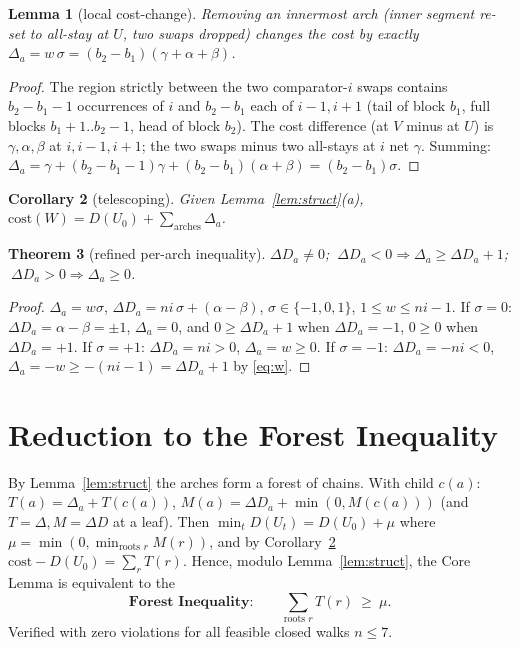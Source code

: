 \documentclass[11pt]{article}
\theoremstyle{plain}
\newtheorem{theorem}{Theorem}
\newtheorem{lemma}[theorem]{Lemma}
\newtheorem{corollary}[theorem]{Corollary}
\theoremstyle{remark}
\newcommand{\cost}{\mathrm{cost}}
\begin{document}
\begin{lemma}[local cost-change]\label{lem:delta}
Removing an innermost arch (inner segment re-set to all-stay at $U$, two swaps dropped)
changes the cost by exactly $\Delta_a=w\,\sigma=(b_2-b_1)(\gamma+\alpha+\beta)$.
\end{lemma}
\begin{proof}
The region strictly between the two comparator-$i$ swaps contains $b_2-b_1-1$ occurrences of
$i$ and $b_2-b_1$ each of $i{-}1,i{+}1$ (tail of block $b_1$, full blocks $b_1{+}1..b_2{-}1$,
head of block $b_2$). The cost difference (at $V$ minus at $U$) is $\gamma,\alpha,\beta$ at
$i,i{-}1,i{+}1$; the two swaps minus two all-stays at $i$ net $\gamma$. Summing:
$\Delta_a=\gamma+(b_2{-}b_1{-}1)\gamma+(b_2{-}b_1)(\alpha+\beta)=(b_2-b_1)\sigma$.
\end{proof}

\begin{corollary}[telescoping]\label{cor:tel}
Given Lemma~\ref{lem:struct}(a), $\cost(W)=D(U_0)+\sum_{\text{arches}}\Delta_a$.
\end{corollary}

\begin{theorem}[refined per-arch inequality]\label{thm:perarch}
$\Delta D_a\ne0$; $\ \Delta D_a<0\Rightarrow\Delta_a\ge\Delta D_a+1$;
$\ \Delta D_a>0\Rightarrow\Delta_a\ge0$.
\end{theorem}
\begin{proof}
$\Delta_a=w\sigma$, $\Delta D_a=ni\,\sigma+(\alpha-\beta)$, $\sigma\in\{-1,0,1\}$,
$1\le w\le ni-1$.
If $\sigma=0$: $\Delta D_a=\alpha-\beta=\pm1$, $\Delta_a=0$, and $0\ge\Delta D_a+1$ when
$\Delta D_a=-1$, $0\ge0$ when $\Delta D_a=+1$.
If $\sigma=+1$: $\Delta D_a=ni>0$, $\Delta_a=w\ge0$.
If $\sigma=-1$: $\Delta D_a=-ni<0$, $\Delta_a=-w\ge-(ni-1)=\Delta D_a+1$ by \eqref{eq:w}.
\end{proof}

\section{Reduction to the Forest Inequality}
By Lemma~\ref{lem:struct} the arches form a forest of chains. With child $c(a)$:
$T(a)=\Delta_a+T(c(a))$, $M(a)=\Delta D_a+\min(0,M(c(a)))$ (and $T=\Delta,M=\Delta D$ at a
leaf). Then $\min_t D(U_t)=D(U_0)+\mu$ where $\mu=\min(0,\min_{\text{roots }r}M(r))$, and by
Corollary~\ref{cor:tel} $\cost-D(U_0)=\sum_r T(r)$. Hence, modulo Lemma~\ref{lem:struct}, the
Core Lemma is equivalent to the
\[
\textbf{Forest Inequality:}\qquad \sum_{\text{roots }r}T(r)\ \ge\ \mu .
\]
Verified with zero violations for all feasible closed walks $n\le7$.
\end{document}
